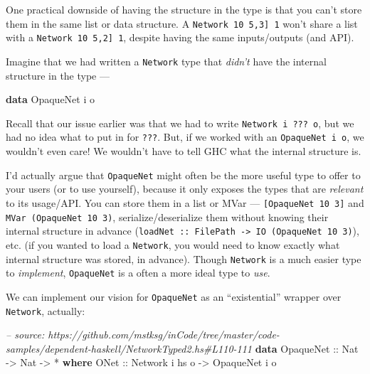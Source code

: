 \documentclass[]{article}
\newenvironment{Shaded}{\begin{snugshade}}{\end{snugshade}}
\newcommand{\CommentTok}[1]{\textcolor[rgb]{0.56,0.35,0.01}{\textit{#1}}}
\newcommand{\DataTypeTok}[1]{\textcolor[rgb]{0.13,0.29,0.53}{#1}}
\newcommand{\FunctionTok}[1]{\textcolor[rgb]{0.00,0.00,0.00}{#1}}
\newcommand{\KeywordTok}[1]{\textcolor[rgb]{0.13,0.29,0.53}{\textbf{#1}}}
\newcommand{\NormalTok}[1]{#1}
\newcommand{\OtherTok}[1]{\textcolor[rgb]{0.56,0.35,0.01}{#1}}
\begin{document}
One practical downside of having the structure in the type is that you can't
store them in the same list or data structure. A
\texttt{Network\ 10\ \textquotesingle{}{[}5,3{]}\ 1} won't share a list with a
\texttt{Network\ 10\ \textquotesingle{}{[}5,2{]}\ 1}, despite having the same
inputs/outputs (and API).

Imagine that we had written a \texttt{Network} type that \emph{didn't} have the
internal structure in the type ---

\begin{Shaded}
\begin{Highlighting}[]
\KeywordTok{data} \DataTypeTok{OpaqueNet}\NormalTok{ i o}
\end{Highlighting}
\end{Shaded}

Recall that our issue earlier was that we had to write
\texttt{Network\ i\ ???\ o}, but we had no idea what to put in for \texttt{???}.
But, if we worked with an \texttt{OpaqueNet\ i\ o}, we wouldn't even care! We
wouldn't have to tell GHC what the internal structure is.

I'd actually argue that \texttt{OpaqueNet} might often be the more useful type
to offer to your users (or to use yourself), because it only exposes the types
that are \emph{relevant} to its usage/API. You can store them in a list or MVar
--- \texttt{{[}OpaqueNet\ 10\ 3{]}} and \texttt{MVar\ (OpaqueNet\ 10\ 3)},
serialize/deserialize them without knowing their internal structure in advance
(\texttt{loadNet\ ::\ FilePath\ -\textgreater{}\ IO\ (OpaqueNet\ 10\ 3)}), etc.
(if you wanted to load a \texttt{Network}, you would need to know exactly what
internal structure was stored, in advance). Though \texttt{Network} is a much
easier type to \emph{implement}, \texttt{OpaqueNet} is a often a more ideal type
to \emph{use}.

We can implement our vision for \texttt{OpaqueNet} as an ``existential'' wrapper
over \texttt{Network}, actually:

\begin{Shaded}
\begin{Highlighting}[]
\CommentTok{-- source: https://github.com/mstksg/inCode/tree/master/code-samples/dependent-haskell/NetworkTyped2.hs#L110-111}
\KeywordTok{data} \DataTypeTok{OpaqueNet}\OtherTok{ ::} \DataTypeTok{Nat} \OtherTok{->} \DataTypeTok{Nat} \OtherTok{->} \FunctionTok{*} \KeywordTok{where}
    \DataTypeTok{ONet}\OtherTok{ ::} \DataTypeTok{Network}\NormalTok{ i hs o }\OtherTok{->} \DataTypeTok{OpaqueNet}\NormalTok{ i o}
\end{Highlighting}
\end{Shaded}
\end{document}
